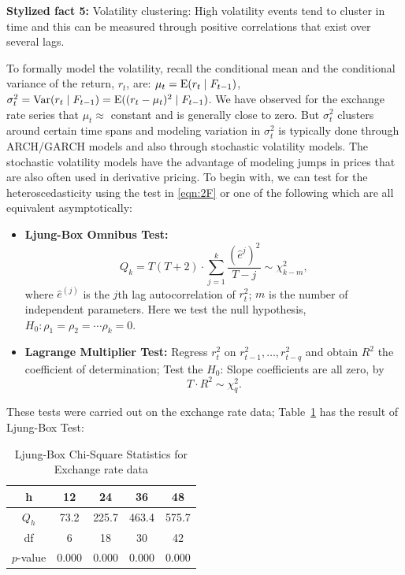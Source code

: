 \noindent\textbf{Stylized fact 5:} Volatility clustering: \label{in:volclust1} High volatility events tend to cluster in time and this can be measured through positive correlations that exist over several lags.


To formally model the volatility, recall the conditional mean and the conditional variance of the return, $r_t$, are: $\mu_t = \operatorname{E}(r_t \;|\; F_{t-1})$, $\sigma_t^2 = \operatorname{Var}(r_t \;|\; F_{t-1}) = \operatorname{E}( (r_t - \mu_t)^2 \;|\; F_{t-1})$. We have observed for the exchange rate series that $\mu_t \approx$ constant and is generally close to zero. But $\sigma_t^2$ clusters around certain time spans and modeling variation in $\sigma_t^2$ is typically done through ARCH/GARCH models and also through stochastic volatility models. The stochastic volatility models have the advantage of modeling jumps in prices that are also often used in derivative pricing. To begin with, we can test for the heteroscedasticity using the test in \eqref{eqn:2F} or one of the following which are all equivalent asymptotically: \label{in:assetvol2} \label{in:style4}


\begin{itemize}
\item \textbf{Ljung-Box Omnibus Test:}
	\begin{equation} \label{eqn:2Qk}
	Q_k = T(T+2) \cdot \sum_{j=1}^k\frac{(\hat{e}^{j})^2}{T - j} \sim \chi_{k-m}^2,
	\end{equation}
where $\hat{e}^{(j)}$ is the $j$th lag autocorrelation of $r_t^2$; $m$ is the number of independent parameters. Here we test the null hypothesis, $H_0: \rho_1 = \rho_2 = \cdots \rho_k = 0$.

\item \textbf{Lagrange Multiplier Test:} Regress $r_t^2$ on $r_{t-1}^2, \ldots, r_{t-q}^2$ and obtain $R^2$ the coefficient of determination; Test the $H_0$: Slope coefficients are all zero, by
	\begin{equation} \label{eqn:2TstarR}
	T \cdot R^2 \sim \chi_q^2.
	\end{equation}
\end{itemize}


These tests were carried out on the exchange rate data; Table~\ref{tab:box} has the result of Ljung-Box Test: 
        \begin{table}[!ht]
        \centering
        \caption{Ljung-Box Chi-Square Statistics for Exchange rate data \label{tab:box}}
        	\begin{tabular}{ccccc}
        	 h & 12 & 24 & 36 & 48 \\ \hline
        	$Q_h$ & 73.2 & 225.7 & 463.4 & 575.7 \\ \hline
        	df & 6 & 18 & 30 & 42 \\ \hline
        	$p$-value & 0.000 & 0.000 & 0.000 & 0.000 \\
        \end{tabular}
        \end{table}


